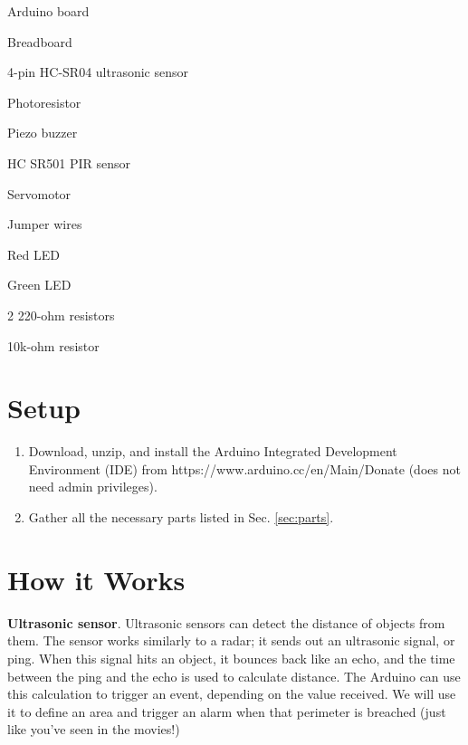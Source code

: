 \documentclass{article}
\begin{document}
\begin{itemize}
\begin{minipage}{0.4\linewidth}
    \item Arduino board
    \item Breadboard
    \item 4-pin HC-SR04 ultrasonic sensor
    \item Photoresistor
    \item Piezo buzzer
    \item HC SR501 PIR sensor
\end{minipage}
\begin{minipage}{0.4\linewidth}
    \item Servomotor
    \item Jumper wires
    \item Red LED
    \item Green LED
    \item 2 220-ohm resistors
    \item 10k-ohm resistor
\end{minipage}
\end{itemize}


\section{Setup}
\begin{enumerate}
\item {Download, unzip, and install the Arduino Integrated Development Environment
    (IDE) from https://www.arduino.cc/en/Main/Donate (does not need admin
    privileges).}
\item {Gather all the necessary parts listed in Sec. \ref{sec:parts}}.
\end{enumerate}

\section{How it Works}
\textbf{Ultrasonic sensor}. Ultrasonic sensors can detect the distance of objects
from them. The sensor works similarly to a radar; it sends out an ultrasonic signal,
or ping. When this signal hits an object, it bounces back like an echo, and the time
between the ping and the echo is used to calculate distance. The Arduino can use this
calculation to trigger an event, depending on the value received. We will use it to
define an area and trigger an alarm when that perimeter is breached (just like you've
seen in the movies!)
\end{document}
